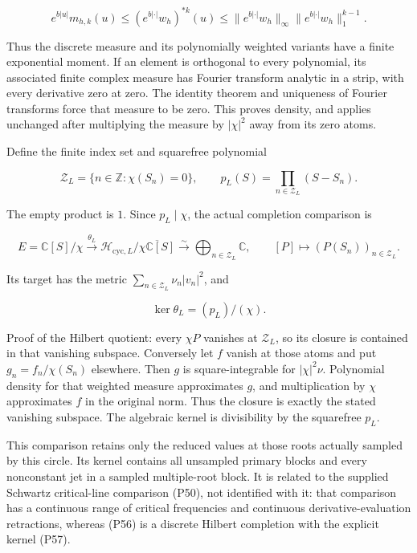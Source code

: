 \[
e^{b|u|}m_{h,k}(u)
\le(e^{b|\cdot|}w_h)^{*k}(u)
\le\|e^{b|\cdot|}w_h\|_\infty
\|e^{b|\cdot|}w_h\|_1^{k-1}.
\tag{P54}
\]

Thus the discrete measure and its polynomially weighted variants have a finite exponential moment. If an element is orthogonal to every polynomial, its associated finite complex measure has Fourier transform analytic in a strip, with every derivative zero at zero. The identity theorem and uniqueness of Fourier transforms force that measure to be zero. This proves density, and applies unchanged after multiplying the measure by \(|\chi|^2\) away from its zero atoms.

Define the finite index set and squarefree polynomial

\[
\mathcal Z_L=\{n\in\mathbb Z:\chi(S_n)=0\},\qquad
p_L(S)=\prod_{n\in\mathcal Z_L}(S-S_n).
\tag{P55}
\]

The empty product is \(1\). Since \(p_L\mid\chi\), the actual completion comparison is

\[
\boxed{
E=\mathbb C[S]/\chi
\xrightarrow{\theta_L}
\mathcal H_{\mathrm{cyc},L}/\overline{\chi\mathbb C[S]}
\xrightarrow{\sim}\bigoplus_{n\in\mathcal Z_L}\mathbb C,
\qquad [P]\longmapsto(P(S_n))_{n\in\mathcal Z_L}.}
\tag{P56}
\]

Its target has the metric \(\sum_{n\in\mathcal Z_L}\nu_n|v_n|^2\), and

\[
\boxed{\ker\theta_L=(p_L)/(\chi).}\tag{P57}
\]

Proof of the Hilbert quotient: every \(\chi P\) vanishes at \(\mathcal Z_L\), so its closure is contained in that vanishing subspace. Conversely let \(f\) vanish at those atoms and put \(g_n=f_n/\chi(S_n)\) elsewhere. Then \(g\) is square-integrable for \(|\chi|^2\nu\). Polynomial density for that weighted measure approximates \(g\), and multiplication by \(\chi\) approximates \(f\) in the original norm. Thus the closure is exactly the stated vanishing subspace. The algebraic kernel is divisibility by the squarefree \(p_L\).

This comparison retains only the reduced values at those roots actually sampled by this circle. Its kernel contains all unsampled primary blocks and every nonconstant jet in a sampled multiple-root block. It is related to the supplied Schwartz critical-line comparison (P50), not identified with it: that comparison has a continuous range of critical frequencies and continuous derivative-evaluation retractions, whereas (P56) is a discrete Hilbert completion with the explicit kernel (P57).

